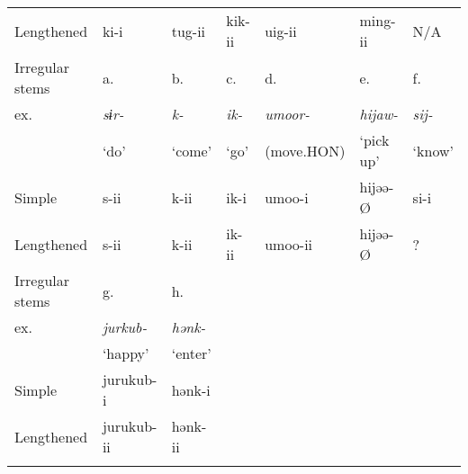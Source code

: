 \begin{tabularx}{\textwidth}{XXXXXXX}
Lengthened & ki-i & tug-ii & kik-ii & uig-ii & ming-ii & N/A\\
Irregular stems & a. & b. & c. & d. & e. & f.\\
ex. & {\itshape sɨr-} & {\itshape k-} & {\itshape ik-} & {\itshape umoor-} & {\itshape hijaw-} & {\itshape sij-}\\
& ‘do’ & ‘come’ & ‘go’ & (move.HON) & ‘pick up’ & ‘know’\\
Simple & s-ii & k-ii & ik-i & umoo-i & hijəə-Ø & si-i\\
Lengthened & s-ii & k-ii & ik-ii & umoo-ii & hijəə-Ø & ?\\
Irregular stems & g. & h. &  &  &  & \\
ex. & {\itshape jurkub-} & {\itshape hənk-} &  &  &  & \\
& ‘happy’ & ‘enter’ &  &  &  & \\
Simple & jurukub-i & hənk-i &  &  &  & \\
Lengthened & jurukub-ii & hənk-ii &  &  &  & \\
\lspbottomrule
\end{tabularx}
